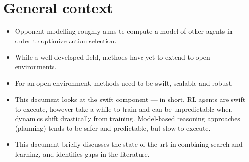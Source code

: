 \section{General context}
\begin{itemize}
    \item Opponent modelling roughly aims to compute a model of other agents in order to optimize action selection.
    \item While a well developed field, methods have yet to extend to open environments. 
    \item For an open environment, methods need to be swift, scalable and robust. 
    \item This document looks at the swift component --- in short, RL agents are swift to execute, however take a while to train and can be unpredictable when dynamics shift drastically from training. Model-based reasoning approaches (planning) tends to be safer and predictable, but slow to execute. 
    \item This document briefly discusses the state of the art in combining search and learning, and identifies gaps in the literature. 

\end{itemize} 